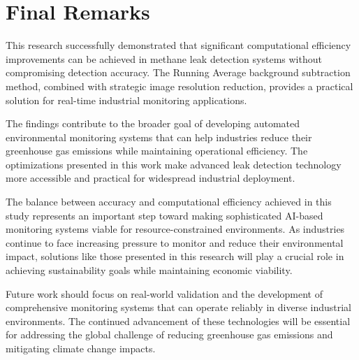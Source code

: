 \section{Final Remarks}

This research successfully demonstrated that significant computational efficiency improvements can be achieved in methane leak detection systems without compromising detection accuracy. The Running Average background subtraction method, combined with strategic image resolution reduction, provides a practical solution for real-time industrial monitoring applications.

The findings contribute to the broader goal of developing automated environmental monitoring systems that can help industries reduce their greenhouse gas emissions while maintaining operational efficiency. The optimizations presented in this work make advanced leak detection technology more accessible and practical for widespread industrial deployment.

The balance between accuracy and computational efficiency achieved in this study represents an important step toward making sophisticated AI-based monitoring systems viable for resource-constrained environments. As industries continue to face increasing pressure to monitor and reduce their environmental impact, solutions like those presented in this research will play a crucial role in achieving sustainability goals while maintaining economic viability.

Future work should focus on real-world validation and the development of comprehensive monitoring systems that can operate reliably in diverse industrial environments. The continued advancement of these technologies will be essential for addressing the global challenge of reducing greenhouse gas emissions and mitigating climate change impacts.
